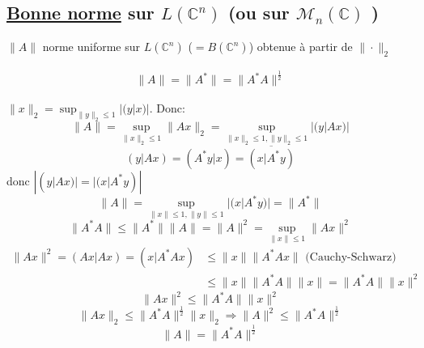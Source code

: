 \documentclass[a4paper]{report}
\let\implies\Rightarrow
\theoremstyle{definition}
\begin{document}
 \subsection{\underline{Bonne norme} sur $L(\mathbb{C}^n)$ (ou sur $\mathcal{M}_n(\mathbb{C})$ )}
 $\|A\|$ norme uniforme sur  $L(\mathbb{C}^n)$ ($= B(\mathbb{C}^n)$) obtenue à partir de $\| \cdot \|_2$
  \begin{lemma}
    \begin{align*}
        \|A\| = \|A^*\| = \|A^*A\|^{\frac{1}{2}}
    \end{align*} 
 \end{lemma}
 \begin{preuve}
    $\|x\|_2 = \sup_{\|y\|_2 \le 1} |(y|x)|$. Donc: 
    \[
        \|A\| = \sup_{\|x\|_2 \le 1} \|Ax\|_2 = \sup_{\|x\|_{2} \le 1, \|y\|_{2} \le 1} |(y|Ax)| 
    \] 
    \[
        (y|Ax) = (A^*y|x) = \overline{(x|A^*y)}
    \] 
    donc $|(y|Ax)| = |(x|A^*y)|$
     \[
        \|A\| = \sup_{\|x\|\le 1, \|y\| \le 1} |(x|A^*y)| = \|A^*\|
    \] 
    \[
        \|A^*A\| \le \|A^*\| \|A\| = \|A\|^2 = \sup_{\|x\| \le 1} \|Ax\|^2
    \] 
    \begin{align*}
        \|Ax\|^2 = (Ax|Ax) = (x|A^*Ax) &\le \|x\| \|A^*Ax\| \text{ (Cauchy-Schwarz)}\\
                                       &\le  \|x\| \|A^*A\| \|x\| = \|A^*A\| \|x\|^2
    \end{align*}
    \[
        \|Ax\|^2 \le \|A^*A\| \|x\|^2
    \] 
    \[
        \|Ax\|_2 \le \|A^*A\|^{\frac{1}{2}}\|x\|_{2} \implies \|A\|^2 \le \|A^*A\|^{\frac{1}{2}}
    \] 
    \[
        \|A\| = \|A^*A\|^{\frac{1}{2}}
    \] 
 \end{preuve}
\end{document}
